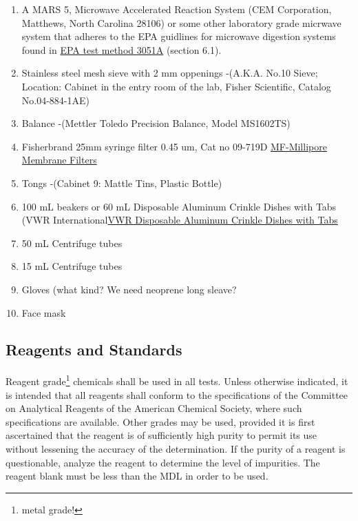 \documentclass[12pt]{../SOP3_beta}\usepackage[]{graphicx}\usepackage[]{color}
\begin{document}
\begin{enumerate}
  \item A MARS 5, Microwave Accelerated Reaction System (CEM Corporation, Matthews, North Carolina 28106) or some other laboratory grade micrwave system that adheres to the EPA guidlines for microwave digestion systems found in \href{https://www.google.com/url?sa=t&rct=j&q=&esrc=s&source=web&cd=1&cad=rja&uact=8&ved=0ahUKEwjNmefY3tfWAhVP92MKHatgCaQQFggqMAA&url=https%3A%2F%2Fwww.epa.gov%2Fsites%2Fproduction%2Ffiles%2F2015-12%2Fdocuments%2F3051a.pdf&usg=AOvVaw1LPlngQyM_L4Zu4SC-sATE}{EPA test method 3051A} (section 6.1). 
  \item Stainless steel mesh sieve with 2 mm oppenings -(A.K.A. No.10 Sieve; Location: Cabinet in the entry room of the lab, Fisher Scientific, Catalog No.04-884-1AE) 
  \item Balance -(Mettler Toledo Precision Balance, Model MS1602TS)
  \item Fisherbrand 25mm syringe filter 0.45 um, Cat no 09-719D \href{https://www.emdmillipore.com/US/en/product/MF-Millipore%E2%84%A2-Membrane-Filters,MM_NF-C152}{MF-Millipore Membrane Filters}
  \item Tongs -(Cabinet 9: Mattle Tins, Plastic Bottle)
  
  \item 100 mL beakers or 60 mL Disposable Aluminum Crinkle Dishes with Tabs (VWR International\href{https://us.vwr.com/store/catalog/product.jsp?product_id=4622693}{VWR Disposable Aluminum Crinkle Dishes with Tabs}
  \item 50 mL Centrifuge tubes
  \item 15 mL Centrifuge tubes
  \item Gloves (what kind? We need neoprene long sleave?
  \item Face mask
\end{enumerate}

\subsection{Reagents and Standards}

\NP Reagent grade\footnote{metal grade!} chemicals shall be used in all tests. Unless otherwise indicated, it is intended that all reagents shall conform to the specifications of the Committee on Analytical Reagents of the American Chemical Society, where such specifications are available. Other grades may be used, provided it is first ascertained that the reagent is of sufficiently high purity to permit its use without lessening the accuracy of the determination. If the purity of a reagent is questionable, analyze the reagent to determine the level of impurities. The reagent blank must be less than the MDL in order to be used. 
\end{document}
